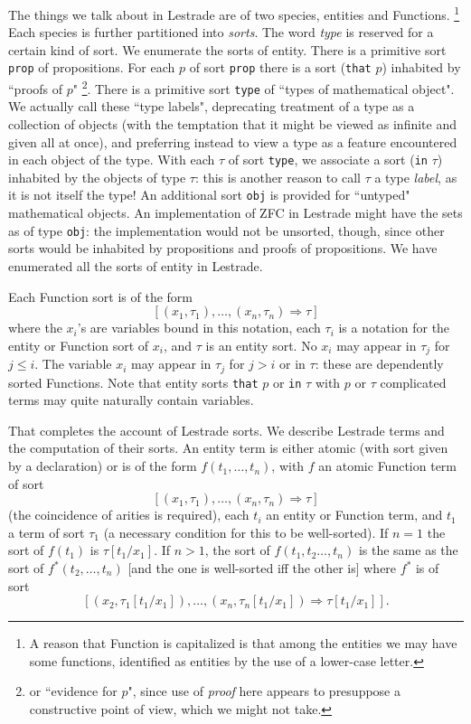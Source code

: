 \documentclass{article}
\begin{document}
The things we talk about in Lestrade are of two species, entities and Functions.  \footnote{A reason that Function is capitalized is that among the entities we may have some functions, identified as entities by the use of a lower-case letter.}  Each species is further partitioned into {\em sorts\/}.  The word {\em type\/} is reserved for a certain kind of sort.  We enumerate the sorts of entity.  There is a primitive sort {\tt prop} of propositions.  For each $p$ of sort
{\tt prop} there is a sort ({\tt that} $p$) inhabited by ``proofs of $p$" \footnote{or ``evidence for $p$", since use of {\em proof\/} here appears to presuppose a constructive point of view, which we might not take.}.  There is a primitive sort {\tt type\/} of ``types of mathematical object".  We actually call these ``type labels",  deprecating treatment of a type as a collection of objects (with the temptation that it might be viewed as infinite and given all at once), and preferring instead to view a type as a feature encountered in each object of the type.  With each $\tau$ of sort {\tt type}, we associate a sort ({\tt in} $\tau$) inhabited by the objects of type $\tau$:  this is another reason to call $\tau$ a type {\em label\/}, as it is not itself the type!  An additional sort {\tt obj} is provided for ``untyped" mathematical objects.  An implementation of ZFC in Lestrade might have the sets as of type {\tt obj}:  the implementation would not be unsorted, though, since other sorts would be inhabited by propositions and proofs of propositions.  We have enumerated all the sorts of entity in Lestrade.

Each Function sort is of the form $$[(x_1,\tau_1),\ldots,(x_n,\tau_n) \Rightarrow \tau]$$  where the $x_i$'s are variables bound in this notation, each $\tau_i$ is a notation for the entity or Function sort of $x_i$, and $\tau$ is an entity sort.  No $x_i$ may appear in $\tau_j$ for $j\leq i$.  The variable $x_i$ may appear in $\tau_j$ for $j>i$ or in $\tau$:  these are dependently sorted Functions.  Note that entity sorts {\tt that} $p$ or {\tt in} $\tau$ with $p$ or $\tau$ complicated terms may quite naturally contain variables.

That completes the account of Lestrade sorts.  We describe Lestrade terms and the computation of their sorts.  An entity term is either atomic (with  sort given by a declaration) or is of the form $f(t_1,\ldots,t_n)$, with $f$ an atomic Function term of sort
$$[(x_1,\tau_1),\ldots,(x_n,\tau_n) \Rightarrow \tau]$$ (the coincidence of arities is required), each $t_i$ an entity or Function term, and $t_1$ a term of sort $\tau_1$ (a necessary condition for this to be well-sorted).  If $n=1$ the sort
of $f(t_1)$ is $\tau[t_1/x_1]$.  If $n>1$, the sort of $f(t_1,t_2\ldots,t_n)$ is the same as the sort of $f^*(t_2,\ldots,t_n)$ [and the one is well-sorted iff the other is] where $f^*$ is of sort
$$[(x_2,\tau_1[t_1/x_1]),\ldots,(x_n,\tau_n[t_1/x_1]) \Rightarrow \tau[t_1/x_1]].$$
\end{document}
